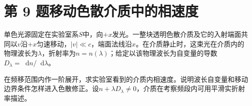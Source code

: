 \documentclass[UTF8,fontset=fandol,a4paper,11pt]{ctexart}
\newcommand{\dd}{\mathop{}\!\mathrm{d}}
\begin{document}


\section*{第 9 题\quad 移动色散介质中的相速度}\label{q:9}

单色光源固定在实验室系$S$中，向$+x$发光。一整块透明色散介质及它的入射端面共同以$v$沿$+x$匀速移动，$|v|\ll c$，端面法线沿$x$。在介质静止时，这束光在介质内的物理波长为$\lambda$，折射率为$n=n(\lambda)$；给定以该物理波长为自变量的导数$D_\lambda=\dd n/\dd\lambda$。

在频移范围内作一阶展开，求实验室看到的介质内相速度。说明波长自变量和移动边界条件怎样进入色散修正。设$n+\lambda D_\lambda\ne0$，介质在考察频段内可用平滑实折射率描述。
\end{document}
